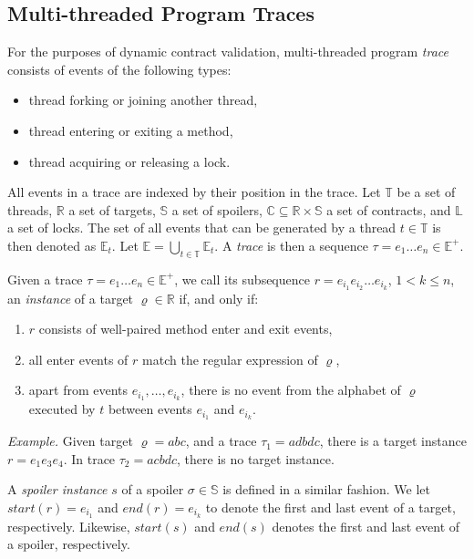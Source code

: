 \subsection{Multi-threaded Program Traces}

For the purposes of dynamic contract validation, multi-threaded program
\emph{trace} consists of events of the following types:
\begin{itemize}
    \item thread forking or joining another thread,
    \item thread entering or exiting a method,
    \item thread acquiring or releasing a lock.
\end{itemize}

All events in a trace are indexed by their position in the trace. Let
$\mathbb{T}$ be a set of threads, $\mathbb{R}$ a set of targets, $\mathbb{S}$ a
set of spoilers, $\mathbb{C} \subseteq \mathbb{R} \times \mathbb{S}$ a set of
contracts, and $\mathbb{L}$ a set of locks. The set of all events that can be
generated by a thread $t \in \mathbb{T}$ is then denoted as $\mathbb{E}_t$. Let
$\mathbb{E} = \bigcup_{t \in \mathbb{T}} \mathbb{E}_t$. A \emph{trace} is then a
sequence $\tau = e_1 \hdots e_n \in \mathbb{E}^+$.


Given a trace $\tau = e_1 \hdots e_n \in \mathbb{E}^+$, we call its subsequence
$r = e_{i_1} e_{i_2} \hdots e_{i_k}$, $1 < k \leq n$, an \emph{instance} of a
target $\varrho \in \mathbb{R}$ if, and only if:
\begin{enumerate}
    \item $r$ consists of well-paired method enter and exit events,
    \item all enter events of $r$ match the regular expression of $\varrho$,
    \item apart from events $e_{i_1},\ldots,e_{i_k}$, there is no event from the
        alphabet of $\varrho$ executed by $t$ between events $e_{i_1}$ and
        $e_{i_k}$.
\end{enumerate}

\emph{Example.} Given target $\varrho = abc$, and a trace $\tau_1 = adbdc$,
there is a target instance $r = e_1 e_3 e_4$. In trace $\tau_2 = acbdc$, there
is no target instance.

A \emph{spoiler instance} $s$ of a spoiler $\sigma \in \mathbb{S}$ is defined in
a similar fashion. We let $start(r) = e_{i_1}$ and $end(r) = e_{i_k}$ to denote
the first and last event of a target, respectively. Likewise, $start(s)$ and
$end(s)$ denotes the first and last event of a spoiler, respectively.


